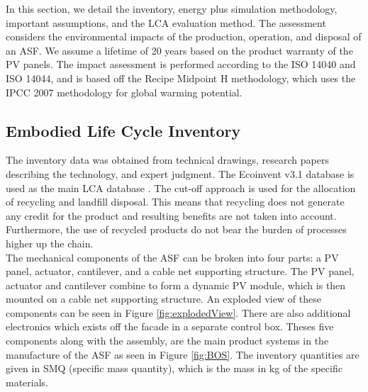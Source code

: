 
In this section, we detail the inventory, energy plus simulation methodology, important assumptions, and the LCA evaluation method. The assessment considers the environmental impacts of the production, operation, and disposal of an ASF. We assume a lifetime of 20 years based on the product warranty of the PV panels. The impact assessment is performed according to the ISO 14040 and ISO 14044, and is based off the Recipe Midpoint H methodology, which uses the IPCC 2007 methodology for global warming potential.\\

\subsection{Embodied Life Cycle Inventory}

The inventory data was obtained from technical drawings, research papers describing the technology, and expert judgment. The Ecoinvent v3.1 database is used as the main LCA database \cite{frischknecht2005ecoinvent}. The cut-off approach is used for the allocation of recycling and landfill disposal. This means that recycling does not generate any credit for the product and resulting benefits are not taken into account. Furthermore, the use of recycled products do not bear the burden of processes higher up the chain.\\

The mechanical components of the ASF can be broken into four parts: a PV panel, actuator, cantilever, and a cable net supporting structure. The PV panel, actuator and cantilever combine to form a dynamic PV module, which is then mounted on a cable net supporting structure. An exploded view of these components can be seen in Figure \ref{fig:explodedView}. There are also additional electronics which exists off the facade in a separate control box. Theses five components along with the assembly, are the main product systems in the manufacture of the ASF as seen in Figure \ref{fig:BOS}. The inventory quantities are given in SMQ (specific mass quantity), which is the mass in kg of the specific materials.



